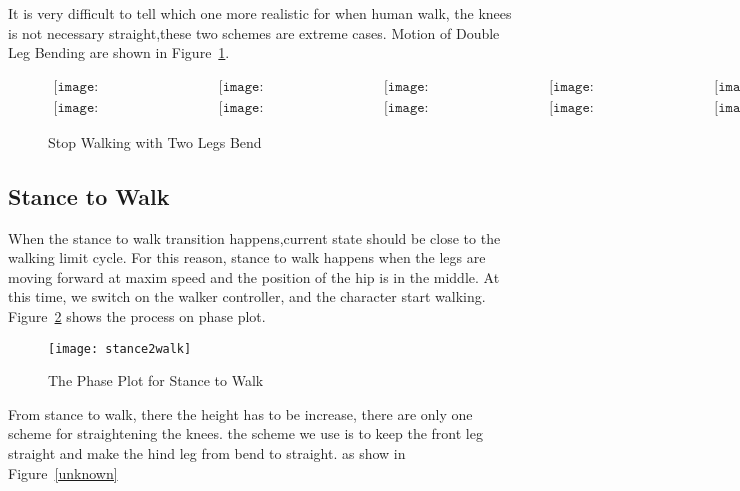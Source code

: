 It is very difficult to tell which one more realistic for when human walk, the knees is not necessary straight,these two schemes are extreme cases.
Motion of Double Leg Bending  are shown in Figure~\ref{fig:walkstancestraight}.
\begin{figure}[!htbp]
  \begin{center}
$\begin{array}{ccccc}
\texttt{[image: WalkStanceTransition/0001.eps]}&
\texttt{[image: WalkStanceTransition/0101.eps]}&
\texttt{[image: WalkStanceTransition/0201.eps]}&
\texttt{[image: WalkStanceTransition/0301.eps]}&
\texttt{[image: WalkStanceTransition/0401.eps]}
\\
\texttt{[image: WalkStanceTransition/0501.eps]}&
\texttt{[image: WalkStanceTransition/0601.eps]}&
\texttt{[image: WalkStanceTransition/0701.eps]}&
\texttt{[image: WalkStanceTransition/0801.eps]}&
\texttt{[image: WalkStanceTransition/0901.eps]}
\end{array}$    
    \caption{Stop Walking with Two Legs Bend}
    \label{fig:walkstancestraight}
\end{center}
\end{figure}



\subsection{Stance to Walk}
When the stance to walk transition happens,current state should  be close to the walking limit cycle.
For this reason, stance to walk happens when the legs are moving forward at maxim speed and the position of the hip is in the middle.
At this time, we switch on the walker controller, and the character start walking.
Figure~\ref{fig:stance2walk} shows the process on phase plot.
\begin{figure}[!htbp]
  \begin{center}
     \texttt{[image: stance2walk]}
    \caption{The Phase Plot for Stance to Walk}
    \label{fig:stance2walk}
\end{center}
\end{figure}


From stance to walk, there the height has to be increase, there are only one scheme for straightening the knees.
the scheme we use is to keep the front leg straight and make the hind leg from bend to straight.
as show in Figure~\ref{unknown}


